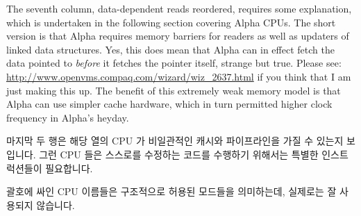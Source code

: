 The seventh column, data-dependent reads reordered, requires some explanation,
which is undertaken in the following section covering Alpha CPUs.
The short version is that Alpha requires memory barriers for readers
as well as updaters of linked data structures.
Yes, this does mean that Alpha can in effect fetch
the data pointed to {\em before} it fetches the pointer itself, strange
but true.
Please see:
\url{http://www.openvms.compaq.com/wizard/wiz_2637.html}
if you think that I am just making this up.
The benefit of this extremely weak memory model is that Alpha can use
simpler cache hardware, which in turn permitted higher clock frequency
in Alpha's heyday.
\fi

마지막 두 행은 해당 열의 CPU 가 비일관적인 캐시와 파이프라인을 가질 수 있는지
보입니다.
그런 CPU 들은 스스로를 수정하는 코드를 수행하기 위해서는 특별한 인스트럭션들이
필요합니다.

괄호에 싸인 CPU 이름들은 구조적으로 허용된 모드들을 의미하는데, 실제로는 잘
사용되지 않습니다.

